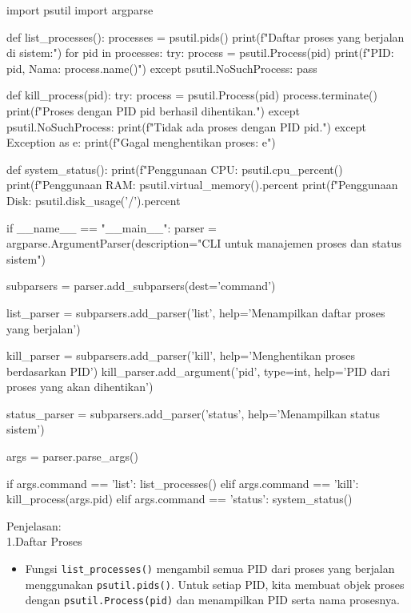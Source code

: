 \documentclass[12pt]{article}
\begin{document}
\begin{python}
    import psutil
    import argparse

    def list_processes():
        processes = psutil.pids()
        print(f"Daftar proses yang berjalan di sistem:")
        for pid in processes:
            try:
                process = psutil.Process(pid)
                print(f"PID: {pid}, Nama: {process.name()}")
            except psutil.NoSuchProcess:
                pass

    def kill_process(pid):
        try:
            process = psutil.Process(pid)
            process.terminate()
            print(f"Proses dengan PID {pid} berhasil dihentikan.")
        except psutil.NoSuchProcess:
            print(f"Tidak ada proses dengan PID {pid}.")
        except Exception as e:
            print(f"Gagal menghentikan proses: {e}")

    def system_status():
        print(f"Penggunaan CPU: {psutil.cpu_percent()}%
        print(f"Penggunaan RAM: {psutil.virtual_memory().percent}%
        print(f"Penggunaan Disk: {psutil.disk_usage('/').percent}%

    if __name__ == "__main__":
        parser = argparse.ArgumentParser(description="CLI untuk manajemen proses dan status sistem")

        subparsers = parser.add_subparsers(dest='command')

        list_parser = subparsers.add_parser('list', help='Menampilkan daftar proses yang berjalan')

        kill_parser = subparsers.add_parser('kill', help='Menghentikan proses berdasarkan PID')
        kill_parser.add_argument('pid', type=int, help='PID dari proses yang akan dihentikan')

        status_parser = subparsers.add_parser('status', help='Menampilkan status sistem')

        args = parser.parse_args()

        if args.command == 'list':
            list_processes()
        elif args.command == 'kill':
            kill_process(args.pid)
        elif args.command == 'status':
            system_status()
\end{python}
Penjelasan:\\

1.Daftar Proses
\begin{itemize}
    \item Fungsi \texttt{list\_processes()} mengambil semua PID dari proses yang berjalan menggunakan \texttt{psutil.pids()}. Untuk setiap PID, kita membuat objek proses dengan \texttt{psutil.Process(pid)} dan menampilkan PID serta nama prosesnya.
\end{itemize}
\end{document}
